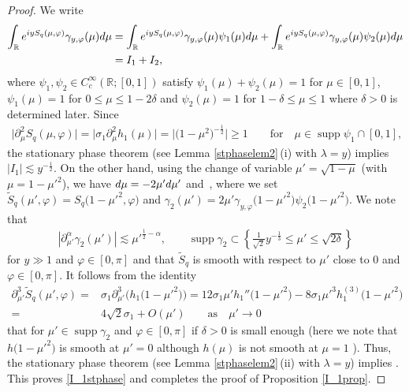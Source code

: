 \documentclass[10pt,a4paper]{article}
\numberwithin{equation}{section}
\def\R{\mathbb{R}}%
\def\d{\,\mathrm{d}}%
\DeclareMathOperator{\supp}{supp}%
\def\a{\alpha}
\def\c{\gamma}
\def\d{\delta}
\def\f{\varphi}
\def\g{\psi}
\def\l{\lambda}
\def\m{\mu}
\def\s{\sigma}
\def\pa{\partial}
\begin{document}
\begin{proof}
We write
\begin{align*}
\int_{\R}{\rm e}^{{\rm i}yS_q(\m,\f) }\c_{y,\f}(\m){\rm d}\m&=\int_{\R}{\rm e}^{{\rm i}yS_q(\m,\f) }\c_{y,\f}(\m)\g_1(\m){\rm d}\m+\int_{\R}{\rm e}^{{\rm i}yS_q(\m,\f) }\c_{y,\f}(\m)\g_2(\m){\rm d}\m\\
&=I_1+I_2,
\end{align*}
where $\g_1,\g_2\in C_c^{\infty}(\R;[0,1])$ satisfy $\g_1(\m)+\g_2(\m)=1$ for $\m\in [0,1]$, $\g_1(\m)=1$ for $0\leq \m\leq 1-2\d$ and $\g_2(\m)=1$ for $1-\d\leq \m\leq 1$ where $\d>0$ is determined later.
Since
\begin{align*}
\big|\pa_{\m}^2S_{q}(\m,\f)\big|=\big|\s_1\pa_{\m}^2h_1(\m)\big|=\big|\bigl(1-\m^2\bigr)^{-\frac{1}{2}}\big|\ge 1\qquad \text{for}\quad \m\in \supp \g_1\cap[0,1],
\end{align*}
the stationary phase theorem (see Lemma \ref{stphaselem2}\,(i) with $\l=y$) implies $|I_1|\lesssim y^{-\frac{1}{2}}$.
On the other hand, using the change of variable $\m'=\sqrt{1-\m}$ (with $\m=1-\m'^2$), we have ${\rm d}\m=-2\m'{\rm d}\m'$ and~\smash{$
I_2=\int_{\R}{\rm e}^{{\rm i}y\tilde{S}_q(\m',\f) }\c_2(\m'){\rm d}\m'$},
where we set $\tilde{S}_q(\m',\f)=S_q\bigl(1-\m'^2,\f\bigr)$ and $\c_2(\m')=2\m'\c_{y,\f}\bigl(1-\m'^2\bigr)\g_2\bigl(1-\m'^2\bigr)$. We note that
\begin{align*}
|\pa_{\m'}^{\a}\c_2(\m')|\lesssim\m'^{\frac{1}{2}-\a},\qquad\supp\c_2\subset \left\{ \frac{1}{\sqrt{2}}y^{-\frac{1}{3}}\leq \m'\leq \sqrt{2\d}\right\}
\end{align*}
for $y\gg 1$ and $\f\in [0,\pi]$ and that $\tilde{S}_q$ is smooth with respect to $\m'$ close to $0$ and $\f\in[0,\pi]$.
It follows from the identity
\begin{align*}
\pa_{\m'}^3\tilde{S}_q(\m',\f)={}&\s_1\pa_{\m'}^3\bigl(h_1\bigl(1-\m'^2\bigr)\bigr)=12\s_1\m' h_1''\bigl(1-\m'^2\bigr)-8\s_1\m'^3h_1^{(3)}\bigl(1-\m'^2\bigr)\\
={}&4\sqrt{2}\s_1+O(\m')\qquad \text{as}\quad \m'\to 0
\end{align*}
that \smash{$\big|\pa_{\m'}^3\tilde{S}_{q}(\m',\f)\big|\gtrsim 1$} for $\m'\in \supp \c_2$ and $\f\in [0,\pi]$ if $\d>0$ is small enough (here we note that~${h\bigl(1-\m'^2\bigr)}$ is smooth at $\m'=0$ although $h(\m)$ is not smooth at $\m=1$ ). Thus, the stationary phase theorem (see Lemma \ref{stphaselem2}\,(ii) with $\l=y$) implies
.
This proves \eqref{I_1stphase} and completes the proof of Proposition \ref{I_1prop}.
\end{proof}
\end{document}
